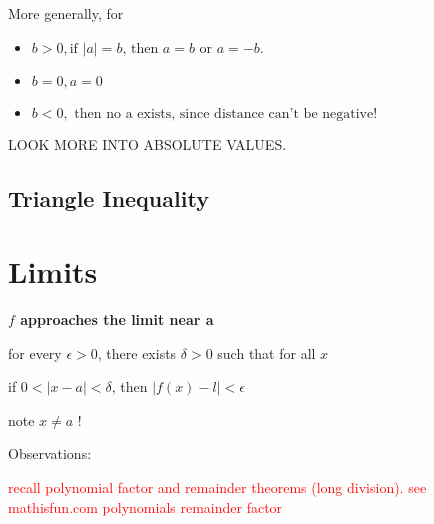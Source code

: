 \documentclass[12pt]{article}
\begin{document}
\noindent More generally, for 
\begin{itemize}
    \item $b > 0,  \text{if } |a| = b\text{, then } a = b \text{ or } a = -b.$ 
    \item $b = 0, a = 0$
    \item $b < 0, \text{ then no a exists, since distance can't be negative!} $
\end{itemize}

LOOK MORE INTO ABSOLUTE VALUES.


\subsection{Triangle Inequality}

\section*{Limits}
\centerline{\textbf{$f$ approaches the limit near a}}
\bigskip

\centerline{for every $\epsilon > 0$, there exists $\delta >0$ such that for all $x$\\}
\medskip
\centerline{if $0 < |x -a| < \delta$, then $|f(x) - l| < \epsilon$}

note $x \neq a$ !

Observations: 

\textcolor{red}{recall polynomial factor and remainder theorems (long division). see
mathisfun.com polynomials remainder factor}
\end{document}

